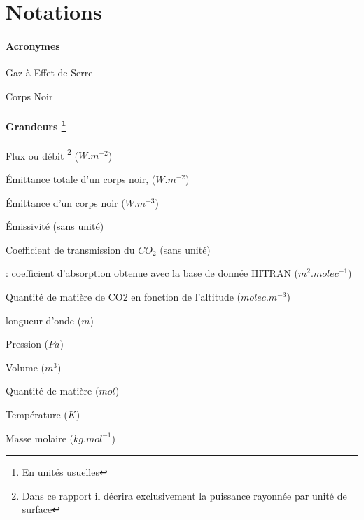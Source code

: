 \documentclass[a4paper, 12pt]{report} %
\begin{document}
\vfill


\newpage
\pagestyle{courant} 
	\setcounter{tocdepth}{2} %
	\tableofcontents %


\newpage
\chapter*{Notations} 

\begin{description}
	\subsubsection*{Acronymes}
	\item[GES:] Gaz à Effet de Serre
    \item[CN:] Corps Noir
    
	\subsubsection*{Grandeurs \footnote{En unités usuelles}}
    \item[\boldmath{$\Phi$}:] Flux ou débit \footnote{Dans ce rapport 
	il décrira exclusivement la puissance rayonnée par unité de surface} ($W.m^{-2}$)
    \item[\boldmath{$M^{0}$}:] Émittance totale d'un corps noir, ($W.m^{-2}$)
    \item[\boldmath{$M^{0}_{\lambda,T}$}:] Émittance d'un corps noir ($W.m^{-3}$)
    \item[\boldmath{$\epsilon$}:] Émissivité (sans unité)
    \item[\boldmath{$\tau_{CO_2}$}:] Coefficient de transmission du $CO_2$ (sans unité)
	\item[\boldmath{$k_{abs}$}:]: coefficient d'absorption obtenue avec la base de donnée HITRAN ($m^2.molec^{-1}$)
     \item[\boldmath{$n_{CO2}(z)$}:] Quantité de matière de CO2 en fonction de l'altitude ($molec.m^{-3}$)
    \item[\boldmath{$\lambda$}:] longueur d'onde ($m$)
    \item[\boldmath{$P$}:] Pression ($Pa$)
    \item[\boldmath{$V$}:] Volume ($m^3$)
	\item[\boldmath{$n$}:] Quantité de matière ($mol$)
	\item[\boldmath{$T$}:] Température ($K$)
 	\item[\boldmath{$M$}:] Masse molaire ($kg.mol^{-1}$)
	

\end{description}
\end{document}
